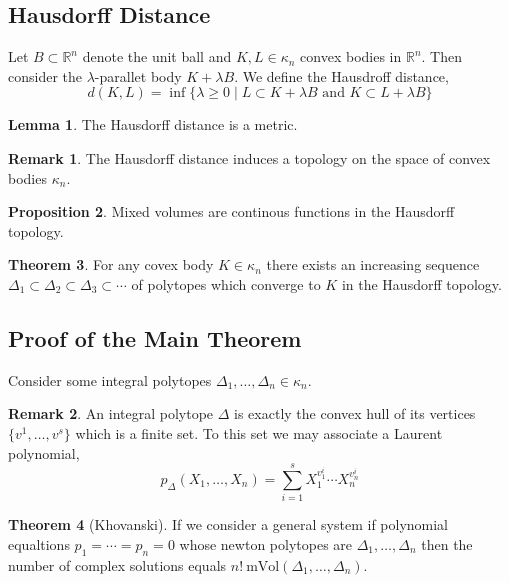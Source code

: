 \documentclass[12pt]{extarticle}
\newcommand{\R}{\mathbb{R}}
\theoremstyle{definition}
\newtheorem{theorem}{Theorem}[section]
\newtheorem{lemma}[theorem]{Lemma}
\newtheorem{proposition}[theorem]{Proposition}
\newtheorem{remark}{Remark}
\newenvironment{definition}[1][Definition:]{\begin{trivlist}
\item[\hskip \labelsep {\bfseries #1}]}{\end{trivlist}}
\newcommand{\mVol}[1]{\mathrm{mVol}\left( #1 \right)}
\begin{document}
\subsection{Hausdorff Distance}

\begin{definition}
Let $B \subset \R^n$ denote the unit ball and $K, L \in \kappa_n$ convex bodies in $\R^n$. Then consider the $\lambda$-parallet body $K + \lambda B$. We define the Hausdroff distance,
\[ d(K, L) = \inf \{\lambda \ge 0 \mid L \subset K + \lambda B \text{ and } K \subset L + \lambda B \} \]
\end{definition}

\begin{lemma}
The Hausdorff distance is a metric. 
\end{lemma}

\begin{remark}
The Hausdorff distance induces a topology on the space of convex bodies $\kappa_n$. 
\end{remark}

\begin{proposition}
Mixed volumes are continous functions in the Hausdorff topology.
\end{proposition}

\begin{theorem}
For any covex body $K \in \kappa_n$ there exists an increasing sequence $\Delta_1 \subset \Delta_2 \subset \Delta_3 \subset \cdots$ of polytopes which converge to $K$ in the Hausdorff topology. 
\end{theorem}

\subsection{Proof of the Main Theorem} 

Consider some integral polytopes $\Delta_1, \dots, \Delta_n \in \kappa_n$. 

\begin{remark}
An integral polytope $\Delta$ is exactly the convex hull of its vertices $\{ v^1, \dots, v^s \}$ which is a finite set. To this set we may associate a Laurent polynomial,
\[ p_\Delta(X_1, \dots, X_n) = \sum_{i = 1}^s X_1^{v^i_1} \cdots X_n^{v^i_n} \]
\end{remark}

\begin{theorem}[Khovanski]
If we consider a general system if polynomial equaltions $p_1 = \cdots = p_n = 0$ whose newton polytopes are $\Delta_1, \dots, \Delta_n$ then the number of complex solutions equals $n! \: \mVol{\Delta_1, \dots, \Delta_n}$. 
\end{theorem}
\end{document}
